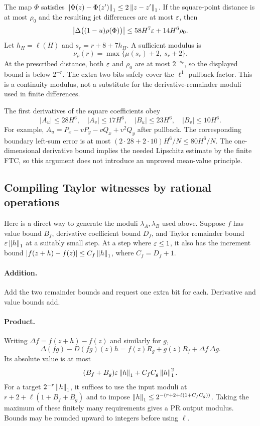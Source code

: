 The map $\Phi$ satisfies
$\left\|\Phi(z)-\Phi(z')\right\|_1\le2\left\|z-z'\right\|_1$.
If the square-point distance is at most $\rho_0$ and the resulting jet differences are at most $\varepsilon$, then
\[
\left|\Delta\bigl((1-u)\rho(\Phi)\bigr)\right|
\le58H^7\varepsilon+14H^6\rho_0.
\]
Let $h_H=\ell(H)$ and $s_r=r+8+7h_H$. A sufficient modulus is
\begin{equation}\label{eq:nu}
\nu_\rho(r)=\max\{\mu(s_r)+2,\ s_r+2\}.
\end{equation}
At the prescribed distance, both $\varepsilon$ and $\rho_0$ are at most $2^{-s_r}$, so the displayed bound is below $2^{-r}$. The extra two bits safely cover the $\ell^1$ pullback factor. This is a continuity modulus, not a substitute for the derivative-remainder moduli used in finite differences.

The first derivatives of the square coefficients obey
\[
|A_u|\le28H^6,\quad |A_v|\le17H^6,\quad
|B_u|\le23H^6,\quad |B_v|\le10H^6.
\]
For example, $A_u=P_x-vP_y-vQ_x+v^2Q_y$ after pullback. The corresponding boundary left-sum error is at most
$(2\cdot28+2\cdot10)H^6/N\le80H^6/N$.
The one-dimensional derivative bound implies the needed Lipschitz estimate by the finite FTC, so this argument does not introduce an unproved mean-value principle.

\subsection{Compiling Taylor witnesses by rational operations}

Here is a direct way to generate the moduli $\lambda_A,\lambda_B$ used above. Suppose $f$ has value bound $B_f$, derivative coefficient bound $D_f$, and Taylor remainder bound $\varepsilon\left\|h\right\|_1$ at a suitably small step. At a step where $\varepsilon\le1$, it also has the increment bound
$|f(z+h)-f(z)|\le C_f\left\|h\right\|_1$, where $C_f=D_f+1$.

\paragraph{Addition.}
Add the two remainder bounds and request one extra bit for each. Derivative and value bounds add.

\paragraph{Product.}
Writing $\Delta f=f(z+h)-f(z)$ and similarly for $g$,
\[
\Delta(fg)-D(fg)(z)h
=f(z)R_g+g(z)R_f+\Delta f\,\Delta g.
\]
Its absolute value is at most
\begin{equation}\label{eq:productTaylor}
(B_f+B_g)\varepsilon\left\|h\right\|_1+C_fC_g\left\|h\right\|_1^2.
\end{equation}
For a target $2^{-r}\left\|h\right\|_1$, it suffices to use the input moduli at
$r+2+\ell(1+B_f+B_g)$ and to impose
$\left\|h\right\|_1\le2^{-(r+2+\ell(1+C_fC_g))}$.
Taking the maximum of these finitely many requirements gives a PR output modulus. Bounds may be rounded upward to integers before using $\ell$.

